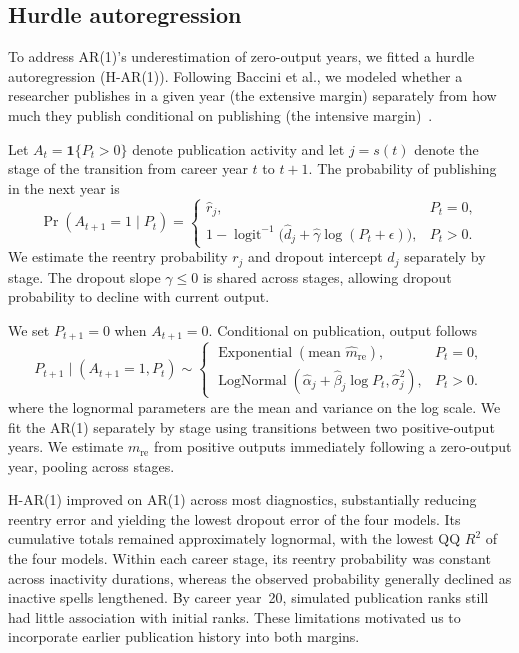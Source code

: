 \documentclass{article}
\begin{document}
\subsection*{Hurdle autoregression}\label{subsec:model_hurdleAR}

To address AR(1)'s underestimation of zero-output years, we fitted a
hurdle autoregression (H-AR(1)). Following Baccini et al., we modeled
whether a researcher publishes in a given year (the extensive margin)
separately from how much they publish conditional on publishing (the
intensive margin)~\cite{bacciniCrossingHurdleDeterminants2014,longitudinal_zero_and_positive_outcomes_farewell2017}.

Let $A_t=\mathbf{1}\{P_t>0\}$ denote publication activity and let
$j=s(t)$ denote the stage of the transition from career year $t$ to
$t+1$. The probability of publishing in the next year is
\begin{equation}
\Pr(A_{t+1}=1\mid P_t)=
\begin{cases}
\hat r_j, & P_t=0,\\
1-\operatorname{logit}^{-1}\!\bigl(\hat d_j+\hat\gamma\log(P_t+\epsilon)\bigr),
    & P_t>0.
\end{cases}
\label{eq:har1-activity}
\end{equation}
We estimate the reentry probability $r_j$ and dropout intercept
$d_j$ separately by stage. The dropout slope $\gamma\leq 0$ is shared
across stages, allowing dropout probability to decline with current
output.

We set $P_{t+1}=0$ when $A_{t+1}=0$. Conditional on publication,
output follows
\begin{equation}
P_{t+1}\mid(A_{t+1}=1,P_t)\sim
\begin{cases}
\operatorname{Exponential}(\text{mean }\hat m_{\mathrm{re}}), & P_t=0,\\
\operatorname{LogNormal}(\hat\alpha_j+\hat\beta_j\log P_t,\hat\sigma_j^2),
    & P_t>0.
\end{cases}
\label{eq:har1-output}
\end{equation}
where the lognormal parameters are the mean and variance on the log
scale. We fit the AR(1) separately by stage using transitions between
two positive-output years. We estimate $m_{\mathrm{re}}$ from positive
outputs immediately following a zero-output year, pooling across stages.

H-AR(1) improved on AR(1) across most diagnostics, substantially
reducing reentry error and yielding the lowest dropout error of the
four models. Its cumulative totals remained approximately lognormal,
with the lowest QQ $R^2$ of the four models. Within each career stage,
its reentry probability was constant across inactivity durations,
whereas the observed probability generally declined as inactive spells
lengthened. By career year~20, simulated publication ranks still had
little association with initial ranks. These limitations motivated us
to incorporate earlier publication history into both margins.
\end{document}
